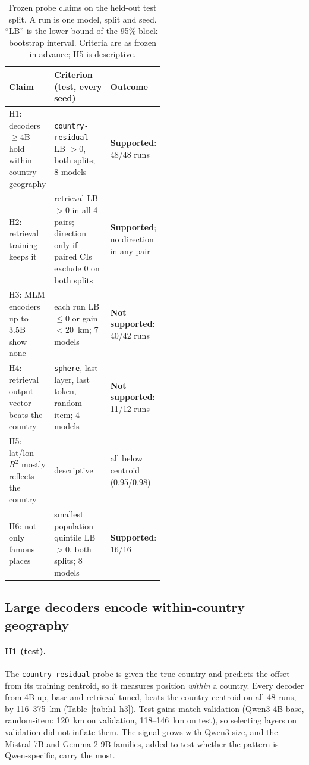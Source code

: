 \begin{table}[htb]
\centering
\footnotesize
\caption{Frozen probe claims on the held-out test split. A run is one model, split and seed. ``LB'' is the lower bound of the 95\% block-bootstrap interval. Criteria are as frozen in advance; H5 is descriptive.}
\label{tab:h-claims}
\begin{tabularx}{\linewidth}{@{}>{\raggedright\arraybackslash}p{0.27\linewidth}>{\raggedright\arraybackslash}X>{\raggedright\arraybackslash}p{0.25\linewidth}@{}}
\toprule
Claim & Criterion (test, every seed) & Outcome \\
\midrule
H1: decoders $\geq$4B hold within-country geography & \texttt{country-residual} LB $>0$, both splits; 8 models & \textbf{Supported}: 48/48 runs \\
H2: retrieval training keeps it & retrieval LB $>0$ in all 4 pairs; direction only if paired CIs exclude 0 on both splits & \textbf{Supported}; no direction in any pair \\
H3: MLM encoders up to 3.5B show none & each run LB $\leq 0$ or gain $<20$~km; 7 models & \textbf{Not supported}: 40/42 runs \\
H4: retrieval output vector beats the country & \texttt{sphere}, last layer, last token, random-item; 4 models & \textbf{Not supported}: 11/12 runs \\
H5: lat/lon $R^2$ mostly reflects the country & descriptive & all below centroid (0.95/0.98) \\
H6: not only famous places & smallest population quintile LB $>0$, both splits; 8 models & \textbf{Supported}: 16/16 \\
\bottomrule
\end{tabularx}
\end{table}

\subsection{Large decoders encode within-country geography}
\label{sec:res-decoders}

\paragraph{H1 (test).}
The \texttt{country-residual} probe is given the true country and predicts the offset from its training centroid, so it measures position \emph{within} a country. Every decoder from 4B up, base and retrieval-tuned, beats the country centroid on all 48 runs, by 116--375~km (Table~\ref{tab:h1-h3}). Test gains match validation (Qwen3-4B base, random-item: 120~km on validation, 118--146~km on test), so selecting layers on validation did not inflate them. The signal grows with Qwen3 size, and the Mistral-7B and Gemma-2-9B families, added to test whether the pattern is Qwen-specific, carry the most.

